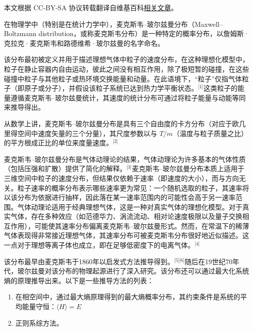 
本文根据 CC-BY-SA 协议转载翻译自维基百科\href{https://en.wikipedia.org/wiki/Maxwell\%E2\%80\%93Boltzmann_distribution}{相关文章}。

在物理学中（特别是在统计力学中），麦克斯韦–玻尔兹曼分布（Maxwell–Boltzmann distribution，或称麦克斯韦分布）是一种特定的概率分布，以詹姆斯·克拉克·麦克斯韦和路德维希·玻尔兹曼的名字命名。

该分布最初被定义并用于描述理想气体中粒子的速度分布，在这种理想化模型中，粒子在静止容器内自由运动，彼此之间没有相互作用，除了极短暂的碰撞，在这些碰撞中粒子与其他粒子或热环境交换能量和动量。在此语境下，“粒子”仅指气体粒子（即原子或分子），并假设该粒子系统已达到热力学平衡状态。\(^\text{[1]}\)这类粒子的能量遵循麦克斯韦–玻尔兹曼统计，其速度的统计分布可通过将粒子能量与动能等同来推导得出。

从数学上讲，麦克斯韦–玻尔兹曼分布是具有三个自由度的卡方分布（对应于欧几里得空间中速度矢量的三个分量），其尺度参数以与 $T/m$（温度与粒子质量之比）的平方根成正比的单位来度量速度。\(^\text{[2]}\)

麦克斯韦–玻尔兹曼分布是气体动理论的结果，气体动理论为许多基本的气体性质（包括压强和扩散）提供了简化的解释。\(^\text{[3]}\)麦克斯韦–玻尔兹曼分布本质上适用于三维空间中粒子的速度分布，但结果仅依赖于速率（即速度的大小），而与方向无关。粒子速率的概率分布表示哪些速率更为常见：一个随机选取的粒子，其速率将以该分布为依据进行抽样，因此落在某一速率范围内的可能性会高于另一速率范围。气体动理论适用于经典理想气体，这是一种对真实气体的理想化模型。对于真实气体，存在多种效应（如范德华力、涡流流动、相对论速度极限以及量子交换相互作用），可能使其速率分布偏离麦克斯韦–玻尔兹曼形式。然而，在常温下的稀薄气体表现得非常接近理想气体，其速率分布可被麦克斯韦分布很好地近似描述。这一点对于理想等离子体也成立，即在足够低密度下的电离气体。\(^\text{[4]}\)

该分布最早由麦克斯韦于1860年以启发式方法推导得到。\(^\text{[5][6]}\)随后在19世纪70年代，玻尔兹曼对该分布的物理起源进行了深入研究。该分布还可以通过最大化系统熵的原理推导出来。以下是一些推导方法的列表：
\begin{enumerate}
\item 在相空间中，通过最大熵原理得到的最大熵概率分布，其约束条件是系统的平均能量守恒：$\langle H \rangle = E$
\item 正则系综方法。
\end{enumerate}
